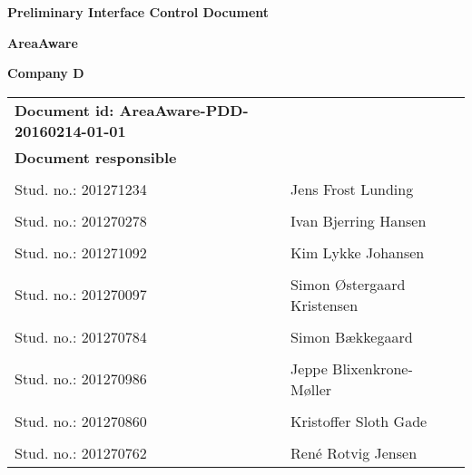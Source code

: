 
\centerline{\Huge\bfseries\color{ThemeColor}Preliminary Interface Control Document} 

\vspace{1em}
\centerline{\Large\bfseries\color{BlackColor} AreaAware} 

\vspace{5em}
\centerline{\large\bfseries\color{BlackColor}Company D} 

\begin{center}
   \begin{tabular}{ l l l }
    \textbf{Document id: AreaAware-PDD-20160214-01-01} && \\
   	\textbf{Document responsible} &  & \\
   & & \\
   Stud. no.: 201271234 & Jens Frost Lunding & \\\hline
   & & \\
   Stud. no.: 201270278 & Ivan Bjerring Hansen & \\\hline
   & & \\
   Stud. no.: 201271092 & Kim Lykke Johansen & \\\hline
   & & \\
   Stud. no.: 201270097 & Simon Østergaard Kristensen & \\\hline
   & & \\
   Stud. no.: 201270784  & Simon Bækkegaard & \\\hline
   & & \\
   Stud. no.:  201270986 & Jeppe Blixenkrone-Møller & \\\hline
   & & \\
   Stud. no.:  201270860 & Kristoffer Sloth Gade & \\\hline
   & & \\
   Stud. no.:  201270762 & René Rotvig Jensen & \\\hline
   \end{tabular}
\end{center}
\thispagestyle{empty} %
\restoregeometry